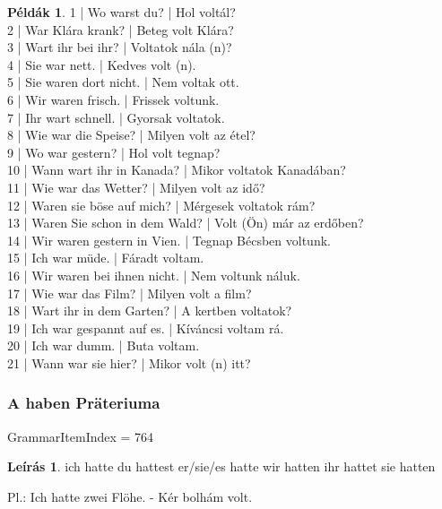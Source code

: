 \documentclass{article}
\theoremstyle{definition}
\newtheorem*{exmp}{Példák}
\newtheorem*{desc}{Leírás}
\begin{document}
\begin{exmp}
1 | Wo warst du? | Hol voltál?\\
2 | War Klára krank? | Beteg volt Klára?\\
3 | Wart ihr bei ihr? | Voltatok nála (n)?\\
4 | Sie war nett. | Kedves volt (n).\\
5 | Sie waren dort nicht. | Nem voltak ott.\\
6 | Wir waren frisch. | Frissek voltunk.\\
7 | Ihr wart schnell. | Gyorsak voltatok.\\
8 | Wie war die Speise? | Milyen volt az étel?\\
9 | Wo war gestern? | Hol volt tegnap?\\
10 | Wann wart ihr in Kanada? | Mikor voltatok Kanadában?\\
11 | Wie war das Wetter? | Milyen volt az idő?\\
12 | Waren sie böse auf mich? | Mérgesek voltatok rám?\\
13 | Waren Sie schon in dem Wald? | Volt (Ön) már az erdőben?\\
14 | Wir waren gestern in Vien. | Tegnap Bécsben voltunk.\\
15 | Ich war müde. | Fáradt voltam.\\
16 | Wir waren bei ihnen nicht. | Nem voltunk náluk.\\
17 | Wie war das Film? | Milyen volt a film?\\
18 | Wart ihr in dem Garten? | A kertben voltatok?\\
19 | Ich war gespannt auf es. | Kíváncsi voltam rá.\\
20 | Ich war dumm. | Buta voltam.\\
21 | Wann war sie hier? | Mikor volt (n) itt?\\
\end{exmp}

\subsubsection{A haben Präteriuma}

GrammarItemIndex = 764

\begin{desc}
ich hatte
du hattest
er/sie/es hatte
wir hatten
ihr hattet
sie hatten

Pl.: Ich hatte zwei Flöhe. - Kér bolhám volt.
\end{desc}
\end{document}
